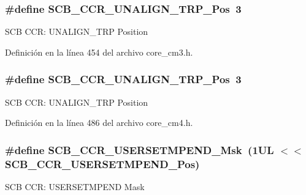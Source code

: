 \subsubsection[{\texorpdfstring{S\+C\+B\+\_\+\+C\+C\+R\+\_\+\+U\+N\+A\+L\+I\+G\+N\+\_\+\+T\+R\+P\+\_\+\+Pos}{SCB_CCR_UNALIGN_TRP_Pos}}]{\setlength{\rightskip}{0pt plus 5cm}\#define S\+C\+B\+\_\+\+C\+C\+R\+\_\+\+U\+N\+A\+L\+I\+G\+N\+\_\+\+T\+R\+P\+\_\+\+Pos~3}\hypertarget{group___c_m_s_i_s___s_c_b_gac4e4928b864ea10fc24dbbc57d976229}{}\label{group___c_m_s_i_s___s_c_b_gac4e4928b864ea10fc24dbbc57d976229}
S\+CB C\+CR\+: U\+N\+A\+L\+I\+G\+N\+\_\+\+T\+RP Position 

Definición en la línea 454 del archivo core\+\_\+cm3.\+h.

\subsubsection[{\texorpdfstring{S\+C\+B\+\_\+\+C\+C\+R\+\_\+\+U\+N\+A\+L\+I\+G\+N\+\_\+\+T\+R\+P\+\_\+\+Pos}{SCB_CCR_UNALIGN_TRP_Pos}}]{\setlength{\rightskip}{0pt plus 5cm}\#define S\+C\+B\+\_\+\+C\+C\+R\+\_\+\+U\+N\+A\+L\+I\+G\+N\+\_\+\+T\+R\+P\+\_\+\+Pos~3}\hypertarget{group___c_m_s_i_s___s_c_b_gac4e4928b864ea10fc24dbbc57d976229}{}\label{group___c_m_s_i_s___s_c_b_gac4e4928b864ea10fc24dbbc57d976229}
S\+CB C\+CR\+: U\+N\+A\+L\+I\+G\+N\+\_\+\+T\+RP Position 

Definición en la línea 486 del archivo core\+\_\+cm4.\+h.

\subsubsection[{\texorpdfstring{S\+C\+B\+\_\+\+C\+C\+R\+\_\+\+U\+S\+E\+R\+S\+E\+T\+M\+P\+E\+N\+D\+\_\+\+Msk}{SCB_CCR_USERSETMPEND_Msk}}]{\setlength{\rightskip}{0pt plus 5cm}\#define S\+C\+B\+\_\+\+C\+C\+R\+\_\+\+U\+S\+E\+R\+S\+E\+T\+M\+P\+E\+N\+D\+\_\+\+Msk~(1\+U\+L $<$$<$ S\+C\+B\+\_\+\+C\+C\+R\+\_\+\+U\+S\+E\+R\+S\+E\+T\+M\+P\+E\+N\+D\+\_\+\+Pos)}\hypertarget{group___c_m_s_i_s___s_c_b_ga4cf59b6343ca962c80e1885710da90aa}{}\label{group___c_m_s_i_s___s_c_b_ga4cf59b6343ca962c80e1885710da90aa}
S\+CB C\+CR\+: U\+S\+E\+R\+S\+E\+T\+M\+P\+E\+ND Mask 

